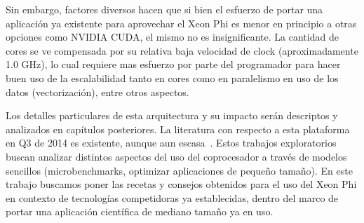 Sin embargo, factores diversos hacen que si bien el esfuerzo de portar una aplicación ya existente para aprovechar el Xeon Phi es menor en principio
a otras opciones como NVIDIA CUDA, el mismo no es insignificante. La cantidad de cores se ve compensada por su relativa baja velocidad de clock
(aproximadamente 1.0 GHz), lo cual requiere mas esfuerzo por parte del programador para hacer buen uso de la escalabilidad tanto en cores como en
paralelismo en uso de los datos (vectorización), entre otros aspectos.

Los detalles particulares de esta arquitectura y su impacto serán descriptos y analizados en capítulos posteriores.
La literatura con respecto a esta plataforma en Q3 de 2014 es existente, aunque aun escasa~\cite{Fang}. Estos trabajos
exploratorios buscan analizar distintos aspectos del uso del coprocesador a trav\'es de  modelos sencillos (microbenchmarks, optimizar aplicaciones de peque\~no tama\~no). En este trabajo buscamos
poner las recetas y consejos obtenidos para el uso del Xeon Phi en contexto de tecnolog\'ias competidoras ya establecidas, dentro del marco de portar una aplicaci\'on cient\'ifica de mediano tama\~no ya en uso.
